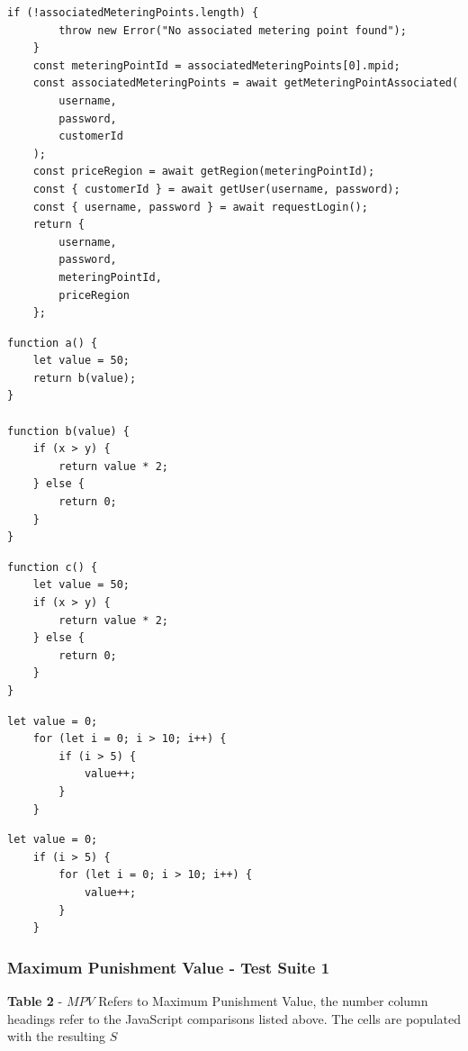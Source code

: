 \documentclass[jou,apacite]{apa6}
\begin{document}
\begin{lstlisting}[caption=Comparison 7b - Real integration against order scrambled integration]
	if (!associatedMeteringPoints.length) {
		throw new Error("No associated metering point found");
	}
	const meteringPointId = associatedMeteringPoints[0].mpid;
	const associatedMeteringPoints = await getMeteringPointAssociated(
		username,
		password,
		customerId
	);
	const priceRegion = await getRegion(meteringPointId);
	const { customerId } = await getUser(username, password);
	const { username, password } = await requestLogin();
	return {
		username,
		password,
		meteringPointId,
		priceRegion
	};
\end{lstlisting}

\begin{lstlisting}[caption=Comparison 8a - Functing call vs inlining]
function a() {
	let value = 50;
	return b(value);
}

function b(value) {
	if (x > y) {
		return value * 2;
	} else {
		return 0;
	}
}
\end{lstlisting}

\begin{lstlisting}[caption=Comparison 8b]
function c() {
	let value = 50;
	if (x > y) {
		return value * 2;
	} else {
		return 0;
	}
}
\end{lstlisting}

\begin{lstlisting}[caption=Comparison 9a - Inversion of control structure]
	let value = 0;
	for (let i = 0; i > 10; i++) {
		if (i > 5) {
			value++;
		}
	}
\end{lstlisting}

\begin{lstlisting}[caption=Comparison 9b - Inversion of control structure]
	let value = 0;
	if (i > 5) {
		for (let i = 0; i > 10; i++) {
			value++;
		}
	}
\end{lstlisting}
\subsubsection{Maximum Punishment Value - Test Suite 1}

\textbf{Table 2} - $MPV$ Refers to Maximum Punishment Value, the number column headings refer to the JavaScript comparisons listed above. The cells are populated with the resulting $S$

\renewcommand{\arraystretch}{1.5}
\end{document}
